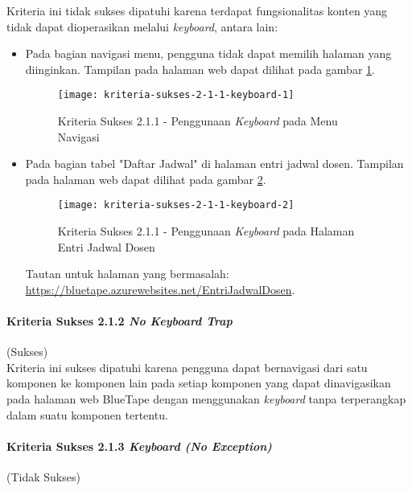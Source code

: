 Kriteria ini tidak sukses dipatuhi karena terdapat fungsionalitas konten yang tidak dapat dioperasikan melalui \textit{keyboard}, antara lain:

\begin{itemize}
    \item Pada bagian navigasi menu, pengguna tidak dapat memilih halaman yang diinginkan. Tampilan pada halaman web dapat dilihat pada gambar \ref{fig:2.1.1_keyboard_1}.
    \begin{figure}[H]
        \centering  
        \texttt{[image: kriteria-sukses-2-1-1-keyboard-1]}  
        \caption[Kriteria Sukses 2.1.1 - Penggunaan \textit{Keyboard} pada Menu Navigasi]{Kriteria Sukses 2.1.1 - Penggunaan \textit{Keyboard} pada Menu Navigasi}
        \label{fig:2.1.1_keyboard_1}  
    \end{figure} 

    \item Pada bagian tabel "Daftar Jadwal" di halaman entri jadwal dosen. Tampilan pada halaman web dapat dilihat pada gambar \ref{fig:2.1.1_keyboard_2}.
    \begin{figure}[H]
        \centering  
        \texttt{[image: kriteria-sukses-2-1-1-keyboard-2]}  
        \caption[Kriteria Sukses 2.1.1 - Penggunaan \textit{Keyboard} pada Halaman Entri Jadwal Dosen]{Kriteria Sukses 2.1.1 - Penggunaan \textit{Keyboard} pada Halaman Entri Jadwal Dosen}
        \label{fig:2.1.1_keyboard_2}  
    \end{figure} 
    Tautan untuk halaman yang bermasalah: \url{https://bluetape.azurewebsites.net/EntriJadwalDosen}.
\end{itemize}

\paragraph{Kriteria Sukses 2.1.2 \textit{No Keyboard Trap}}
\label{par:kepatuhan_bluetape_kriteria_sukses_2.1.2}
(Sukses)\\

Kriteria ini sukses dipatuhi karena pengguna dapat bernavigasi dari satu komponen ke komponen lain pada setiap komponen yang dapat dinavigasikan pada halaman web BlueTape dengan menggunakan \textit{keyboard} tanpa terperangkap dalam suatu komponen tertentu.

\paragraph{Kriteria Sukses 2.1.3 \textit{Keyboard (No Exception)}}
\label{par:kepatuhan_bluetape_kriteria_sukses_2.1.3}
(Tidak Sukses)\\

